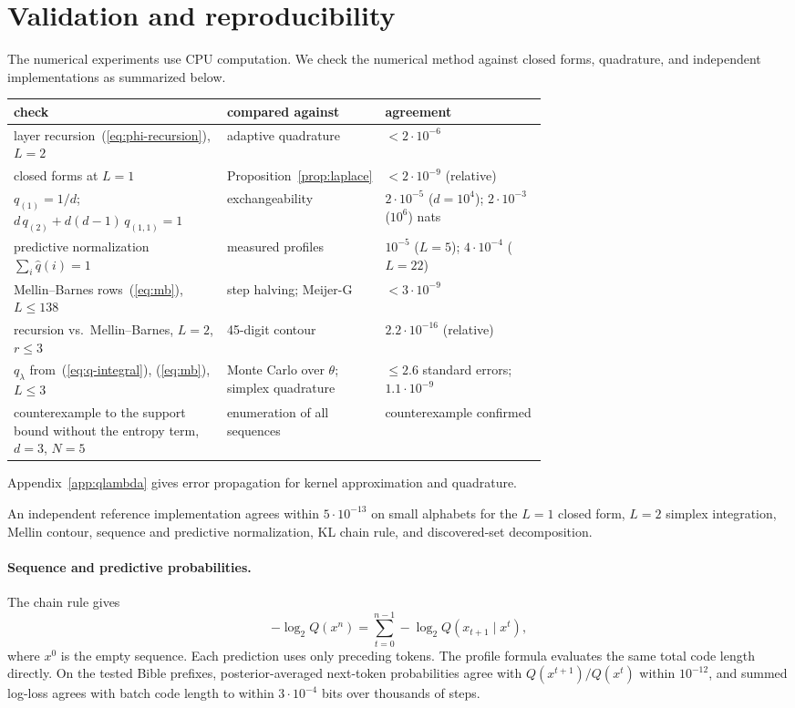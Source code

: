 \documentclass[anon]{alt2027}
\renewcommand{\eqref}[1]{(\ref{#1})}
\begin{document}
\FloatBarrier \section{Validation and reproducibility}
\label{app:validation}
The numerical experiments use CPU computation. We check the numerical method against closed forms, quadrature, and independent implementations as summarized below.
\begin{center}\footnotesize\setlength{\tabcolsep}{2pt} \begin{tabular}{@{}p{0.40\linewidth}p{0.28\linewidth}p{}@{}}
\toprule
check & compared against & agreement \\
\midrule
layer recursion~\eqref{eq:phi-recursion}, $L=2$ & adaptive quadrature & $<2\cdot10^{-6}$ \\
closed forms at $L=1$ & Proposition~\ref{prop:laplace} & $<2\cdot10^{-9}$ (relative) \\
$q_{(1)}=1/d$; $d\,q_{(2)}+d(d-1)\,q_{(1,1)}=1$ & exchangeability & $2\cdot10^{-5}$ ($d{=}10^4$); $2\cdot10^{-3}$ ($10^6$) nats \\
predictive normalization $\sum_i\hat q(i)=1$ & measured profiles & $10^{-5}$ ($L=5$); $4\cdot10^{-4}$ ($L=22$) \\
Mellin--Barnes rows~\eqref{eq:mb}, $L\le138$ & step halving; Meijer-G & $<3\cdot10^{-9}$ \\
recursion vs.\ Mellin--Barnes, $L=2$, $r\le3$ & 45-digit contour & $2.2\cdot10^{-16}$ (relative) \\
$q_\lambda$ from~\eqref{eq:q-integral}, \eqref{eq:mb}, $L\le3$ & Monte Carlo over $\theta$; simplex quadrature & $\le2.6$ standard errors; $1.1\cdot10^{-9}$ \\
counterexample to the support bound without the entropy term, $d=3$, $N=5$ & enumeration of all sequences & counterexample confirmed \\
\bottomrule
\end{tabular}
\end{center}
Appendix~\ref{app:qlambda} gives error propagation for kernel approximation and quadrature.

An independent reference implementation agrees within $5\cdot10^{-13}$ on small alphabets for the $L=1$ closed form, $L=2$ simplex integration, Mellin contour, sequence and predictive normalization, KL chain rule, and discovered-set decomposition.

\paragraph{Sequence and predictive probabilities.} The chain rule gives \[ -\log_2Q(x^n)=\sum_{t=0}^{n-1}-\log_2Q(x_{t+1}\mid x^t), \] where $x^0$ is the empty sequence. Each prediction uses only preceding tokens. The profile formula evaluates the same total code length directly. On the tested Bible prefixes, posterior-averaged next-token probabilities agree with $Q(x^{t+1})/Q(x^t)$ within $10^{-12}$, and summed log-loss agrees with batch code length to within $3\cdot10^{-4}$ bits over thousands of steps.
\end{document}
